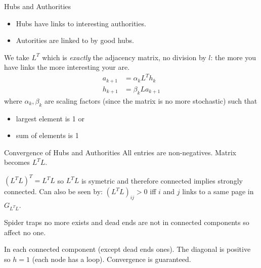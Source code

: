 \documentclass[10pt]{beamer}
\begin{document}
\begin{frame}{Hubs and Authorities}
  \begin{itemize}
    \item Hubs have links to interesting authorities.
    \item Autorities are linked to by good hubs.
  \end{itemize}
  We take $L^T$ which is \emph{exactly} the adjacency matrix, no division by $l$:
  the more you have links the more interesting your are.
  \begin{align*}
    a_{k+1} & = \alpha_k L^T h_k\\
    h_{k+1} & = \beta_k  L a_{k+1}
  \end{align*}
  where $\alpha_k, \beta_k$ are scaling factors (since the matrix is no more stochastic)
  such that
  \begin{itemize}
    \item largest element is 1 or
    \item sum of elements is 1
  \end{itemize}
\end{frame}

\begin{frame}{Convergence of Hubs and Authorities}
  All entries are non-negatives.
  Matrix becomes $L^TL$.

  $(L^TL)^T = L^TL$ so $L^TL$ is symetric and therefore connected implies strongly connected.
  Can also be seen by:
  $(L^TL)_{ij} > 0$ iff $i$ and $j$ links to a same page in $G_{L^TL}$.

  Spider traps no more exists and dead ends are not in connected components so affect no one.

  In each connected component (except dead ends ones).
  The diagonal is positive so $h = 1$ (each node has a loop).
  Convergence is guaranteed.
\end{frame}
\end{document}
